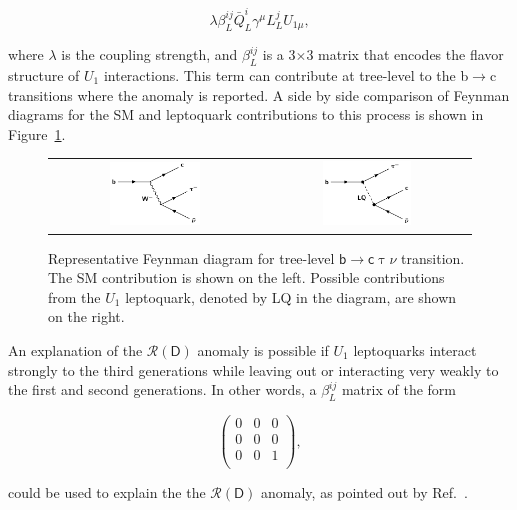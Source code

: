 \begin{equation}
\lambda\beta^{ij}_{L}\bar{Q}_{L}^{i}\gamma^{\mu}L_{L}^{j}U_{1\mu},
\end{equation}

where $\lambda$ is the coupling strength, and $\beta^{ij}_{L}$ is a 3$\times$3 matrix that encodes the flavor structure of $U_{1}$ interactions. This term can contribute at tree-level to the b$\rightarrow$c transitions where the anomaly is reported. A side by side comparison of Feynman diagrams for the \ac{SM} and leptoquark contributions to this process is shown in Figure~\ref{fig:Leptoquark}.

\begin{figure}[tbh!]
 \begin{center}
 \begin{tabular}{cc}
 \includegraphics[width=0.45\textwidth]{figures/Part1/BSM/SMbtoc}&
 \includegraphics[width=0.45\textwidth]{figures/Part1/BSM/Leptoquark}\\
 \end{tabular}
 \caption{Representative Feynman diagram for tree-level $\textsf{b}\rightarrow\textsf{c}\uptau\nu$ transition. The \ac{SM} contribution is shown on the left. Possible contributions from the $U_{1}$ leptoquark, denoted by LQ in the diagram, are shown on the right.}
 \label{fig:Leptoquark}
 \end{center}
\end{figure}

An explanation of the $\mathcal{R}(\textsf{D})$ anomaly is possible if $U_{1}$ leptoquarks interact strongly to the third generations while leaving out or interacting very weakly to the first and second generations. In other words, a $\beta^{ij}_{L}$ matrix of the form

\begin{equation}
\begin{pmatrix}
0 & 0 & 0\\
0 & 0 & 0\\
0 & 0 & 1\\
\end{pmatrix},
\end{equation}

could be used to explain the the $\mathcal{R}(\textsf{D})$ anomaly, as pointed out by Ref.~\cite{Cornella:2021sby}.